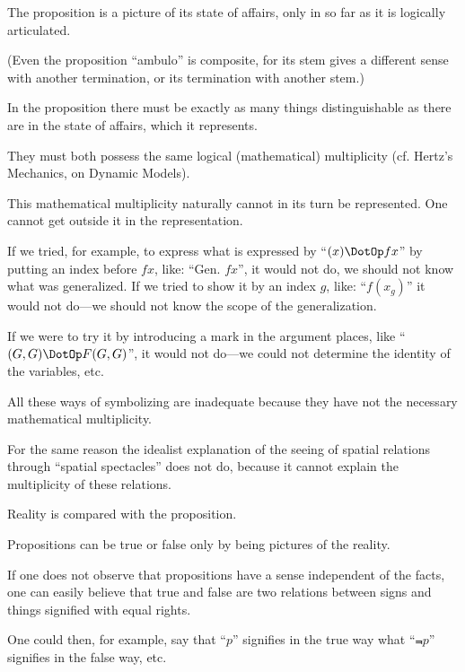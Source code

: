{The proposition is a picture of its state of
affairs, only in so far as it is logically articulated.

(Even the proposition ``ambulo'' is composite,
for its stem gives a different sense with another
termination, or its termination with another
stem.)}


{In the proposition there must be exactly as
many things distinguishable as there are in the
state of affairs, which it represents.

They must both possess the same logical
(mathematical) multiplicity (cf. Hertz's Mechanics,
on Dynamic Models).}


{This mathematical multiplicity naturally cannot
in its turn be represented. One cannot get outside
it in the representation.}


{If we tried, for example, to express what is
expressed by ``$(x) \DotOp fx$'' by putting an index before
$fx$, like: ``Gen. $fx$'', it would not do, we should
not know what was generalized. If we tried to
show it by an index $g$, like: ``$f(x_{g})$'' it would not
do---we should not know the scope of the generalization.

If we were to try it by introducing a mark
in the argument places, like ``$(G,G) \DotOp F(G,G)$'', it
would not do---we could not determine the identity
of the variables, etc.

All these ways of symbolizing are inadequate
because they have not the necessary mathematical
multiplicity.}


{For the same reason the idealist explanation of
the seeing of spatial relations through ``spatial
spectacles'' does not do, because it cannot explain
the multiplicity of these relations.}


{Reality is compared with the proposition.}


{Propositions can be true or false only by being
pictures of the reality.}


{If one does not observe that propositions have
a sense independent of the facts, one can easily
believe that true and false are two relations
between signs and things signified with equal
rights.

One could then, for example, say that ``$p$''
signifies in the true way what ``$\Not{p}$'' signifies in
the false way, etc.}


